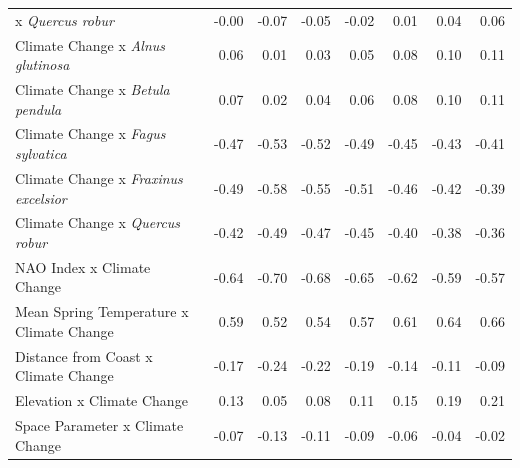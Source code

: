 \documentclass{article}\usepackage[]{graphicx}\usepackage[]{color}
\begin{document}
\begin{longtable}{lrrrrrrr}
x\textit{ Quercus robur} & -0.00 & -0.07 & -0.05 & -0.02 & 0.01 & 0.04 & 0.06 \\ 
  Climate Change
x\textit{ Alnus glutinosa} & 0.06 & 0.01 & 0.03 & 0.05 & 0.08 & 0.10 & 0.11 \\ 
  Climate Change
x\textit{ Betula pendula} & 0.07 & 0.02 & 0.04 & 0.06 & 0.08 & 0.10 & 0.11 \\ 
  Climate Change
x\textit{ Fagus sylvatica} & -0.47 & -0.53 & -0.52 & -0.49 & -0.45 & -0.43 & -0.41 \\ 
  Climate Change
x\textit{ Fraxinus excelsior} & -0.49 & -0.58 & -0.55 & -0.51 & -0.46 & -0.42 & -0.39 \\ 
  Climate Change
x\textit{ Quercus robur} & -0.42 & -0.49 & -0.47 & -0.45 & -0.40 & -0.38 & -0.36 \\ 
  NAO Index x Climate Change & -0.64 & -0.70 & -0.68 & -0.65 & -0.62 & -0.59 & -0.57 \\ 
  Mean Spring 
Temperature x Climate Change & 0.59 & 0.52 & 0.54 & 0.57 & 0.61 & 0.64 & 0.66 \\ 
  Distance from 
Coast x Climate Change & -0.17 & -0.24 & -0.22 & -0.19 & -0.14 & -0.11 & -0.09 \\ 
  Elevation x Climate Change & 0.13 & 0.05 & 0.08 & 0.11 & 0.15 & 0.19 & 0.21 \\ 
  Space Parameter x Climate Change & -0.07 & -0.13 & -0.11 & -0.09 & -0.06 & -0.04 & -0.02 \\ 
   \hline
\hline
\end{longtable}
\end{document}
